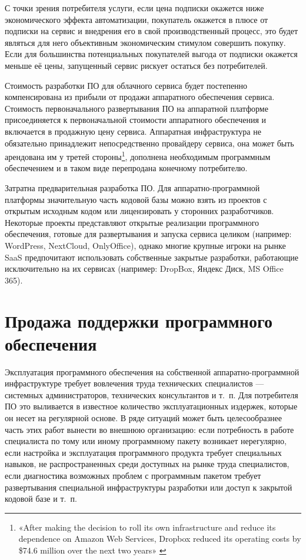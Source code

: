 \documentclass{article}
\begin{document}
С точки зрения потребителя услуги, если цена подписки окажется ниже экономического эффекта автоматизации, покупатель окажется в плюсе от подписки на сервис и внедрения его в свой производственный процесс, это будет являться для него объективным экономическим стимулом совершить покупку. Если для большинства потенциальных покупателей выгода от подписки окажется меньше её цены, запущенный сервис рискует остаться без потребителей.

Стоимость разработки ПО для облачного сервиса будет постепенно компенсирована из прибыли от продажи аппаратного обеспечения сервиса. Стоимость первоначального развертывания ПО на аппаратной платформе присоединяется к первоначальной стоимости аппаратного обеспечения и включается в продажную цену сервиса. Аппаратная инфраструктура не обязательно принадлежит непосредственно провайдеру сервиса, она может быть арендована им у третей стороны\footnote{«After making the decision to roll its own infrastructure and reduce its dependence on Amazon Web Services, Dropbox reduced its operating costs by \$74.6 million over the next two years» \cite{dropboxBuildsOwnInfra}}, дополнена необходимым программным обеспечением и в таком виде перепродана конечному потребителю.

Затратна предварительная разработка ПО. Для аппаратно-программной платформы значительную часть кодовой базы можно взять из проектов с открытым исходным кодом или лицензировать у сторонних разработчиков. Некоторые проекты представляют открытые реализации программного обеспечения, готовые для развертывания и запуска сервиса целиком (например: WordPress, NextCloud, OnlyOffice), однако многие крупные игроки на рынке SaaS предпочитают использовать собственные закрытые разработки, работающие исключительно на их сервисах (например: DropBox, Яндекс Диск, MS Office 365).

\section*{Продажа поддержки программного обеспечения}

Эксплуатация программного обеспечения на собственной аппаратно-программной инфраструктуре требует вовлечения труда технических специалистов — системных администраторов, технических консультантов и т.~п. Для потребителя ПО это выливается в известное количество эксплуатационных издержек, которые он несет на регулярной основе. В ряде ситуаций может быть целесообразнее часть этих работ вынести во внешнюю организацию: если потребность в работе специалиста по тому или иному программному пакету возникает нерегулярно, если настройка и эксплуатация программного продукта требует специальных навыков, не распространенных среди доступных на рынке труда специалистов, если диагностика возможных проблем с программным пакетом требует развертывания специальной инфраструктуры разработки или доступ к закрытой кодовой базе и т.~п.
\end{document}
